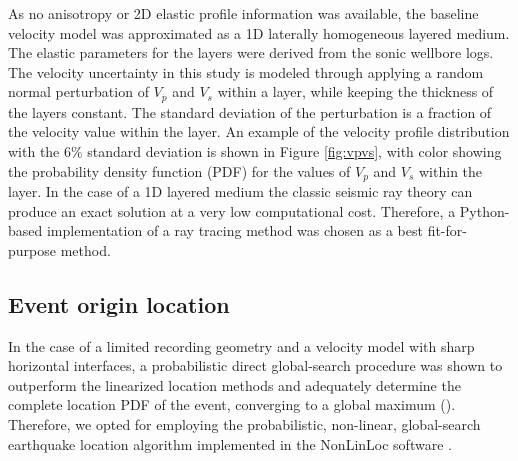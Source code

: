 \documentclass[letterpaper,11pt]{article}
\begin{document}
As no anisotropy or 2D elastic profile information was available, the baseline velocity model was approximated as a 1D laterally homogeneous layered medium. The elastic parameters for the layers were derived from the sonic wellbore logs. The velocity uncertainty in this study is modeled through applying a random normal perturbation of $V_{p}$ and $V_{s}$ within a layer, while keeping the thickness of the layers constant. The standard deviation of the perturbation is a fraction of the velocity value within the layer. An example of the velocity profile distribution with the 6\% standard deviation is shown in Figure \ref{fig:vpvs}, with color showing the probability density function (PDF) for the values of $V_{p}$ and $V_{s}$ within the layer. In the case of a 1D layered medium the classic seismic ray theory can produce an exact solution at a very low computational cost. Therefore, a Python-based implementation of a ray tracing method was chosen as a best fit-for-purpose method.



\subsection*{Event origin location} %
In the case of a limited recording geometry and a velocity model with sharp horizontal interfaces, a probabilistic direct global-search procedure was shown to outperform the linearized location methods and adequately determine the complete location PDF of the event, converging to a global maximum (\citet{lomax_earthquake_2009}). Therefore, we opted for employing the probabilistic, non-linear, global-search earthquake location algorithm implemented in the NonLinLoc software \cite{lomax_precise_2001}.

\end{document}

